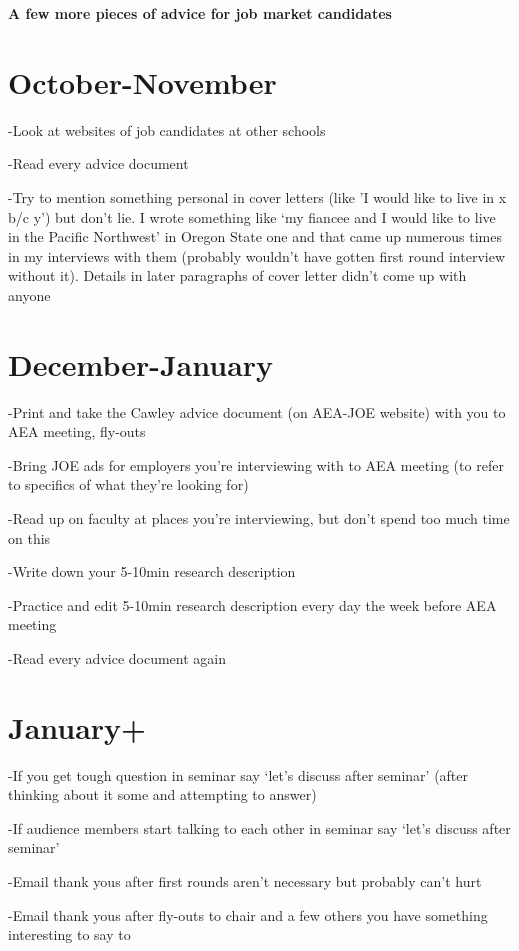 \documentclass[11pt]{article}
\begin{document}
\begin{center}
{\Large {\bf A few more pieces of advice for job market candidates}}
\\[5pt]
\end{center}

\section{October-November}
\noindent -Look at websites of job candidates at other schools
\medskip

\noindent -Read every advice document
\medskip

\noindent -Try to mention something personal in cover letters (like
'I would like to live in x b/c y') but don't lie.  I wrote something
like `my fiancee and I would like to live in the Pacific Northwest'
in Oregon State one and that came up numerous times in my interviews
with them (probably wouldn't have gotten first round interview
without it). Details in later paragraphs of cover letter didn't come
up with anyone
\medskip

\section{December-January}
\noindent -Print and take the Cawley advice document (on AEA-JOE
website) with you to AEA meeting, fly-outs
\medskip

\noindent -Bring JOE ads for employers you're interviewing with to
AEA meeting (to refer to specifics of what they're looking for)
\medskip

\noindent -Read up on faculty at places you're interviewing, but
don't spend too much time on this
\medskip

\noindent -Write down your 5-10min research description
\medskip

\noindent -Practice and edit 5-10min research description every day
the week before AEA meeting
\medskip

\noindent -Read every advice document again
\medskip

\section{January+}
\noindent -If you get tough question in seminar say `let's discuss
after seminar' (after thinking about it some and attempting to
answer)
\medskip

\noindent -If audience members start talking to each other in
seminar say `let's discuss after seminar'
\medskip

\noindent -Email thank yous after first rounds aren't necessary but
probably can't hurt
\medskip

\noindent -Email thank yous after fly-outs to chair and a few others
you have something interesting to say to
\end{document}
